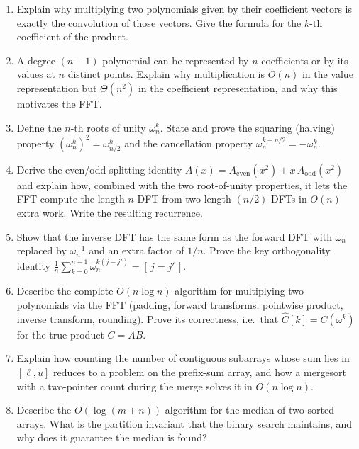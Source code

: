 \documentclass[11pt]{article}
\begin{document}
\begin{enumerate}[label=\textbf{A\arabic*.}, leftmargin=2.2em]
\item Explain why multiplying two polynomials given by their coefficient vectors is exactly
the convolution of those vectors. Give the formula for the $k$-th coefficient of the product.

\item A degree-$(n-1)$ polynomial can be represented by $n$ coefficients or by its values at
$n$ distinct points. Explain why multiplication is $O(n)$ in the value representation but
$\Theta(n^2)$ in the coefficient representation, and why this motivates the FFT.

\item Define the $n$-th roots of unity $\omega_n^k$. State and prove the squaring (halving)
property $(\omega_n^k)^2 = \omega_{n/2}^k$ and the cancellation property
$\omega_n^{k + n/2} = -\omega_n^k$.

\item Derive the even/odd splitting identity $A(x) = A_{\text{even}}(x^2) + x\,
A_{\text{odd}}(x^2)$ and explain how, combined with the two root-of-unity properties, it lets
the FFT compute the length-$n$ DFT from two length-$(n/2)$ DFTs in $O(n)$ extra work. Write
the resulting recurrence.

\item Show that the inverse DFT has the same form as the forward DFT with $\omega_n$ replaced
by $\omega_n^{-1}$ and an extra factor of $1/n$. Prove the key orthogonality identity
$\frac{1}{n}\sum_{k=0}^{n-1}\omega_n^{k(j-j')} = [\,j = j'\,]$.

\item Describe the complete $O(n \log n)$ algorithm for multiplying two polynomials via the
FFT (padding, forward transforms, pointwise product, inverse transform, rounding). Prove its
correctness, i.e.\ that $\hat C[k] = C(\omega^k)$ for the true product $C = AB$.

\item Explain how counting the number of contiguous subarrays whose sum lies in $[\ell, u]$
reduces to a problem on the prefix-sum array, and how a mergesort with a two-pointer count
during the merge solves it in $O(n \log n)$.

\item Describe the $O(\log(m+n))$ algorithm for the median of two sorted arrays. What is the
partition invariant that the binary search maintains, and why does it guarantee the median is
found?

\end{enumerate}
\end{document}
